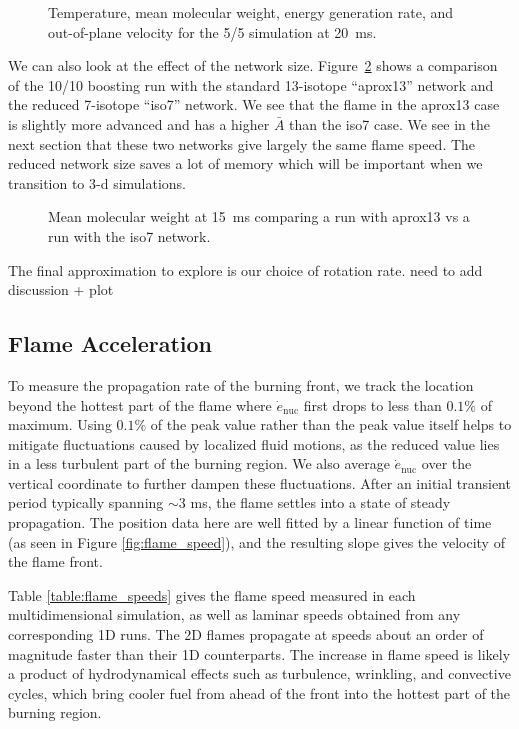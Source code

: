 \documentclass[preprint,times,tighten]{aastex63}
\begin{document}
\begin{figure}[h]
\centering
{}
\caption{\label{fig:5_5_overview} Temperature, mean molecular weight, energy generation rate, and out-of-plane velocity for the 5/5 simulation at 20~ms.}
\end{figure}

We can also look at the effect of the network size.
Figure~\ref{fig:network} shows a comparison of the 10/10 boosting run
with the standard 13-isotope ``aprox13'' network and the reduced
7-isotope ``iso7'' network.  We see that the flame in the aprox13 case
is slightly more advanced and has a higher $\bar{A}$ than the iso7
case.  We see in the next section that these two networks give largely
the same flame speed.  The reduced network size saves a lot of memory
which will be important when we transition to 3-d simulations.

\begin{figure}[h]
\centering
{}
\caption{\label{fig:network} Mean molecular weight at 15~ms comparing a run with
  aprox13 vs a run with the iso7 network.}
\end{figure}


The final approximation to explore is our choice of rotation rate.
{\color{red} need to add discussion + plot}

\subsection{Flame Acceleration}

To measure the propagation rate of the burning front, we track the
location beyond the hottest part of the flame where
$\dot{e}_\mathrm{nuc}$ first drops to less than $0.1 \%$ of
maximum. Using $0.1 \%$ of the peak value rather than the peak value
itself helps to mitigate fluctuations caused by localized fluid
motions, as the reduced value lies in a less turbulent part of the
burning region. We also average $\dot{e}_\mathrm{nuc}$ over the
vertical coordinate to further dampen these fluctuations. After an
initial transient period typically spanning $\sim 3$ ms, the flame
settles into a state of steady propagation. The position data here are
well fitted by a linear function of time (as seen in Figure
\ref{fig:flame_speed}), and the resulting slope gives the velocity of
the flame front.

Table \ref{table:flame_speeds} gives the flame speed measured in each
multidimensional simulation, as well as laminar speeds obtained from
any corresponding 1D runs. The 2D flames propagate at speeds about an
order of magnitude faster than their 1D counterparts. The increase in
flame speed is likely a product of hydrodynamical effects such as
turbulence, wrinkling, and convective cycles, which bring cooler fuel
from ahead of the front into the hottest part of the burning region.
\end{document}
